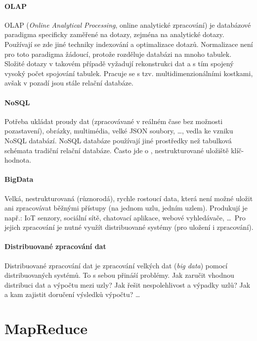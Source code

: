 \paragraph*{OLAP} OLAP (\textit{Online Analytical Processing}, online analytické zpracování) je databázové paradigma specificky zaměřené na dotazy, zejména na analytické dotazy. Používají se zde jiné techniky indexování a optimalizace dotazů. Normalizace není pro toto paradigma žádoucí, protože rozděluje databázi na mnoho tabulek. Složité dotazy v takovém případě vyžadují rekonstrukci dat a s tím spojený vysoký počet spojování tabulek. Pracuje se s tzv. multidimenzionálními kostkami, avšak v pozadí jsou stále relační databáze.

\paragraph*{NoSQL} Potřeba ukládat proudy dat (zpracovávané v reálném čase bez možnosti pozastavení), obrázky, multimédia, velké JSON soubory, \dots, vedla ke vzniku NoSQL databází. NoSQL databáze používají jiné prostředky než tabulková schémata tradiční relační databáze. Často jde o , nestrukturované uložiště klíč-hodnota.

\paragraph*{BigData} Velká, nestrukturovaná (různorodá), rychle rostoucí data, která není možné uložit ani zpracovávat běžnými přístupy (na jednom uzlu, jedním uzlem). Produkují je např.: IoT senzory, sociální sítě, chatovací aplikace, webové vyhledávače, \dots \, Pro jejich zpracování je nutné využít distribuované systémy (pro uložení i zpracování).

\paragraph*{Distribuované zpracování dat} Distribuované zpracování dat je zpracování velkých dat (\textit{big data}) pomocí distribuovaných systémů. To s sebou přináší problémy. Jak zaručit vhodnou distribuci dat a výpočtu mezi uzly? Jak řešit nespolehlivost a výpadky uzlů? Jak a kam zajistit doručení výsledků výpočtu? \dots


\section{MapReduce}


